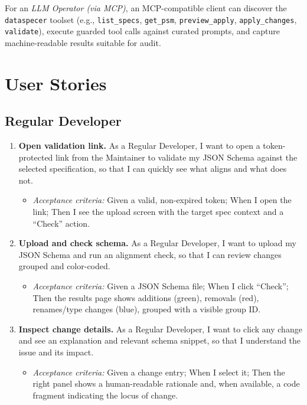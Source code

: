 For an \textit{LLM Operator (via MCP)}, an MCP-compatible client can discover the \texttt{dataspecer} toolset (e.g., \texttt{list\_specs}, \texttt{get\_psm}, \texttt{preview\_apply}, \texttt{apply\_changes}, \texttt{validate}), execute guarded tool calls against curated prompts, and capture machine-readable results suitable for audit.

\section{User Stories}

\subsection*{Regular Developer}
\begin{enumerate}
  \item \textbf{Open validation link.} As a Regular Developer, I want to open a token-protected link from the Maintainer to validate my JSON Schema against the selected specification, so that I can quickly see what aligns and what does not. 
  \begin{itemize}
    \item \emph{Acceptance criteria:} Given a valid, non-expired token; When I open the link; Then I see the upload screen with the target spec context and a “Check” action.
  \end{itemize}

  \item \textbf{Upload and check schema.} As a Regular Developer, I want to upload my JSON Schema and run an alignment check, so that I can review changes grouped and color-coded. 
  \begin{itemize}
    \item \emph{Acceptance criteria:} Given a JSON Schema file; When I click “Check”; Then the results page shows additions (green), removals (red), renames/type changes (blue), grouped with a visible group ID.
  \end{itemize}

  \item \textbf{Inspect change details.} As a Regular Developer, I want to click any change and see an explanation and relevant schema snippet, so that I understand the issue and its impact. 
  \begin{itemize}
    \item \emph{Acceptance criteria:} Given a change entry; When I select it; Then the right panel shows a human-readable rationale and, when available, a code fragment indicating the locus of change.
  \end{itemize}


\end{enumerate}
